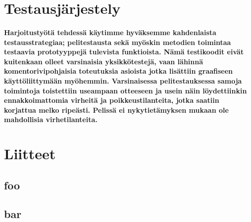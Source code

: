 \documentclass[10pt,a4paper,draft]{article}
\begin{document}
\section{Testausjärjestely}
\paragraph{Harjoitustyötä tehdessä käytimme hyväksemme kahdenlaista testausstrategiaa; pelitestausta sekä myöskin metodien toimintaa testaavia prototyyppejä tulevista funktioista. Nämä testikoodit eivät kuitenkaan olleet varsinaisia yksikkötestejä, vaan lä\-hin\-nä komentorivipohjaisia toteutuksia asioista jotka lisättiin graafiseen käyttöliittymään myöhemmin. Varsinaisessa pelitestauksessa samoja toimintoja toistettiin useampaan otteeseen ja usein näin löydettiinkin ennakkoimattomia virheitä ja poikkeustilanteita, jotka saatiin korjattua melko ripeästi. Pelissä ei nykytietämyksen mukaan ole mahdollisia virhetilanteita.}

\newpage
\section{Liitteet}
\renewcommand{\thesubsection}{\thesection.\alph{subsection}}
\subsection{foo}
\subsection{bar}
\end{document}
